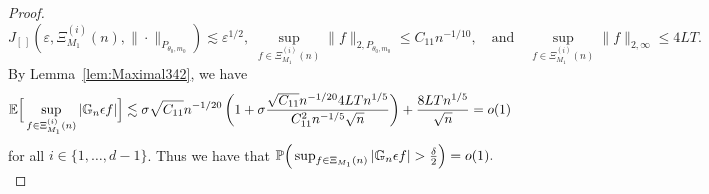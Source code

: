 {\begin{proof}
{\begin{equation}
 J_{[\,]}(\varepsilon, \Xi^{(i)}_{M_1}(n), \|\cdot\|_{P_{\theta_0,m_0}}) \lesssim \varepsilon^{1/2},\;  \sup_{f \in \Xi^{(i)}_{M_1}(n)} \|f\|_{2,P_{\theta_0,m_0}}   \le C_{11} n^{-1/10}, \quad\text{and}\quad \sup_{f\in\Xi^{(i)}_{M_1}(n)}\|f\|_{2, \infty} \le 4LT.
 \end{equation}
} 
By Lemma~\ref{lem:Maximal342}, we have
\begin{equation}\label{eq:first_step_f_i1}
\mathbb{E}  \Big[\sup_{f \in \Xi^{(i)}_{M_1}(n) } |\mathbb{G}_n \epsilon f|\Big] \lesssim \sigma  \sqrt{C_{11}} n^{-1/20}\left(1 + \sigma \frac{\sqrt{C_{11}} n^{-1/20} 4LT n^{1/5}}{C_{11}^2n^{-1/5} \sqrt{n}}\right)+ \frac{ 8LT n^{1/5}}{\sqrt{n}} =o(1)
\end{equation}
for all $i\in \{1,\ldots, d-1\}$. Thus we have that $\p\Big(\sup_{f \in \Xi_{M_1}(n) } |\g_n \epsilon f|> \frac{\delta}{2}\Big) =o(1).$ \qedhere

\end{proof}


}

